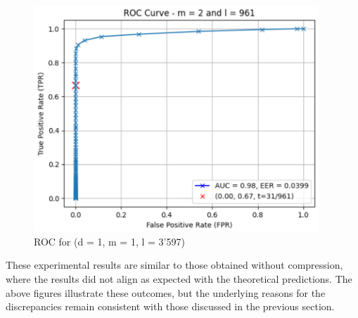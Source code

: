 \begin{enumerate}
\begin{itemize}
            \begin{figure}[H]
                \centering
                \includegraphics[width=\linewidth,height=8.5cm,keepaspectratio]{latex-img/FNR-FPR_ROC_TPR_config2.png}
                \caption{ROC for (d = 1, m = 1, l = 3'597)}
                \label{FNR-FPR_ROC_TPR_config2}
            \end{figure}
        \end{itemize}
\end{enumerate}

These experimental results are similar to those obtained without compression, where the results did not align as expected with the theoretical predictions. The above figures illustrate these outcomes, but the underlying reasons for the discrepancies remain consistent with those discussed in the previous section.
